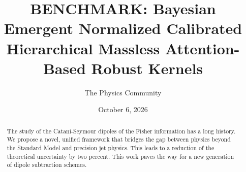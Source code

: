 \documentclass[11pt]{article}
\title{BENCHMARK: Bayesian Emergent Normalized Calibrated Hierarchical Massless Attention-Based Robust Kernels}
\author{The Physics Community}
\date{October 6, 2026}
\begin{document}
\maketitle
\begin{abstract}
The study of the Catani-Seymour dipoles of the Fisher information has a
long history. We propose a novel, unified framework that bridges the gap
between physics beyond the Standard Model and precision jet physics.
This leads to a reduction of the theoretical uncertainty by two percent.
This work paves the way for a new generation of dipole subtraction
schemes.
\end{abstract}
\tableofcontents





\nocite{*}


\end{document}
